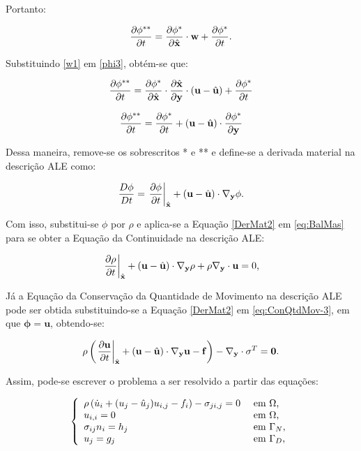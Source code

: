 \documentclass[_ArquivoPrincipal.tex]{subfiles}
\begin{document}
\noindent Portanto:

\begin{equation}
    \frac{\partial{\phi^{**}}}{\partial{t}}=\frac{\partial{\phi^{*}}}{\partial{\hat{\mathbf{x}}}}\cdot\mathbf{w}+\frac{\partial{\phi^{*}}}{\partial{t}}\text{.}
    \label{phi3}
\end{equation}

Substituindo \ref{w1} em \ref{phi3}, obtém-se que:

\[\frac{\partial{\phi^{**}}}{\partial{t}}=\frac{\partial{\phi^{*}}}{\partial{\hat{\mathbf{x}}}}\cdot\frac{\partial{\hat{\mathbf{x}}}}{\partial{\mathbf{y}}}\cdot(\mathbf{u}-\hat{\mathbf{u}})+\frac{\partial{\phi^{*}}}{\partial{t}}\]

\[\frac{\partial{\phi^{**}}}{\partial{t}}=\frac{\partial{\phi^{*}}}{\partial{t}}+(\mathbf{u}-\hat{\mathbf{u}})\cdot\frac{\partial{\phi^{*}}}{\partial{\mathbf{y}}}\]

Dessa maneira, remove-se os sobrescritos * e ** e define-se a derivada material na descrição ALE como:

\begin{equation}
    \frac{D\phi}{Dt}=\left.\frac{\partial{\phi}}{\partial{t}}\right|_{\hat{\mathbf{x}}}+(\mathbf{u}-\hat{\mathbf{u}})\cdot\mathbf{\nabla_y}\phi\text{.}\label{DerMat2}
\end{equation}

Com isso, substitui-se $\phi$ por $\rho$ e aplica-se a Equação \ref{DerMat2} em \ref{eq:BalMas} para se obter a Equação da Continuidade na descrição ALE:

\begin{equation}
    \left.\frac{\partial{\rho}}{\partial{t}}\right|_{\hat{\mathbf{x}}}+(\mathbf{u}-\hat{\mathbf{u}})\cdot\mathbf{\nabla_y}\rho+\rho\mathbf{\nabla_y}\cdot\mathbf{u}=0\text{,}
    \label{ConMas4}
\end{equation}

Já a Equação da Conservação da Quantidade de Movimento na descrição ALE pode ser obtida substituindo-se a Equação \ref{DerMat2} em \ref{eq:ConQtdMov-3}, em que $\mathbf{\phi}=\mathbf{u}$, obtendo-se:

\begin{equation}
    \rho\left(\left.\frac{\partial{\mathbf{u}}}{\partial{t}}\right|_{\hat{\mathbf{x}}}+(\mathbf{u}-\hat{\mathbf{u}})\cdot\mathbf{\nabla_y}\mathbf{u}-\mathbf{f}\right)-\mathbf{\nabla_y}\cdot\mathbf{\sigma}^T=\mathbf{0}\text{.}
    \label{ConQtdMov10}
\end{equation}

Assim, pode-se escrever o problema a ser resolvido a partir das equações:

\begin{equation}
    \left\{
    \begin{array}{ll}
        \rho\left({\dot{u}_i+(u_j-\hat{u}_j)u_{i,j}-f_i}\right)-\sigma_{ji,j}=0 & \text{ em }\Omega\text{,}   \\
        u_{i,i}=0                                                         & \text{ em }\Omega\text{,}   \\
        \sigma_{ij}n_i=h_j                                                & \text{ em }\Gamma_N\text{,} \\
        u_j=g_j                                                           & \text{ em }\Gamma_D\text{,}
    \end{array}
    \right.\label{eq:NS-ALE}
\end{equation}
\end{document}
